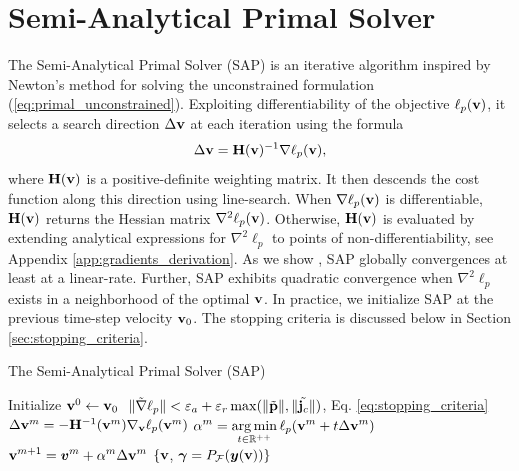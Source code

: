 
\section{Semi-Analytical Primal Solver}
\label{sec:sap_solver}

The Semi-Analytical Primal Solver (SAP) is an iterative algorithm inspired
by Newton's method for solving the unconstrained  formulation (\ref{eq:primal_unconstrained}). Exploiting differentiability of the objective
$\ell_p({\mathbf{v}})$, it selects a search direction $\Delta{\mathbf{v}}$ at each iteration using the
formula
\[
  \Delta{\mathbf{v}} =  {\mathbf{H}}({\mathbf{v}})^{-1} \nabla \ell_p({\mathbf{v}}),
\]
where ${\mathbf{H}}({\mathbf{v}})$ is a positive-definite weighting
matrix. It then descends the cost function along this direction
using line-search.  When $\nabla \ell_p({\mathbf{v}})$ is differentiable,
${\mathbf{H}}({\mathbf{v}})$ returns the Hessian matrix $\nabla^2 \ell_p({\mathbf{v}})$.
Otherwise, ${\mathbf{H}}({\mathbf{v}})$ is evaluated by extending
analytical expressions for $\nabla^2 \ell_p$ to points
of non-differentiability, see Appendix \ref{app:gradients_derivation}.  As we show , SAP 
globally convergences at least at a linear-rate.
Further, SAP exhibits quadratic convergence when
$\nabla^2 \ell_p$ exists in a neighborhood of the
optimal ${\mathbf{v}}$.
In practice, we initialize SAP at the previous time-step velocity ${\mathbf{v}}_0$.
The stopping criteria is discussed below in Section
\ref{sec:stopping_criteria}.

\begin{algorithm}[H]
  \caption{The Semi-Analytical Primal Solver (SAP)}	
	\label{alg:sap}
	\begin{algorithmic}[1]
		\State Initialize ${\mathbf{v}}^0 \gets {\mathbf{v}}_0$
		\RepeatUntil $~\Vert\tilde{\nabla}\ell_p\Vert < \varepsilon_a + \varepsilon_r\max(\Vert\tilde{{\mathbf{p}}}\Vert,\Vert\tilde{{\mathbf{j}}_c}\Vert)$, Eq. \eqref{eq:stopping_criteria}
			\State $\Delta{\mathbf{v}}^{m} = -{\mathbf{H}}^{-1}({\mathbf{v}}^m)\nabla_{\mathbf{v}}\ell_p({\mathbf{v}}^m)$ \label{op:Newton_iteration}
			\State $\displaystyle \alpha^m = \operatorname*{arg\,min}_{t\in\mathbb{R}^{++}} \ell_p({\mathbf{v}}^m + t \Delta{\mathbf{v}}^{m})$
			\State $\displaystyle {\mathbf{v}}^{m+1} = {\bm{v}}^m + \alpha^{m}\Delta{\mathbf{v}}^{m}$
		\EndRepeatUntil
		\State\Return $\{{\mathbf{v}}$, ${\bm\gamma}=P_\mathcal{F}({\bm{y}}({\mathbf{v}}))\}$
	\end{algorithmic}
\end{algorithm}

